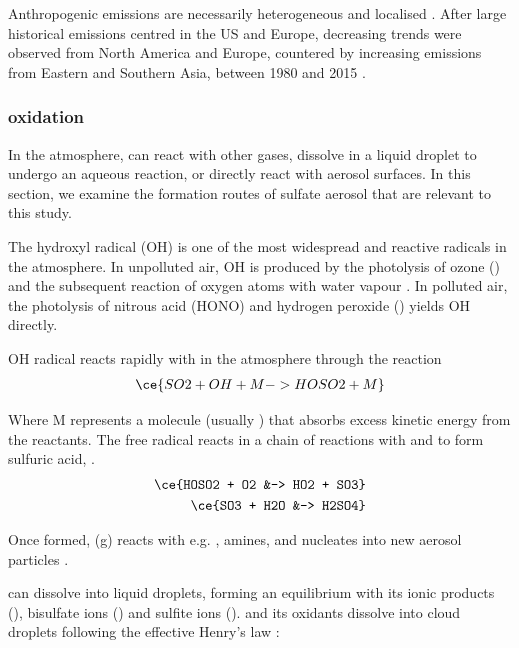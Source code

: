Anthropogenic  emissions are necessarily heterogeneous and localised \citep{manktelowRegionalGlobalTrends2007}. After large historical emissions centred in the US and Europe, decreasing trends were observed from North America and Europe, countered by increasing emissions from Eastern and Southern Asia, between 1980 and 2015 \citep{szopaShortlivedClimateForcers2021, aasGlobalRegionalTrends2019}. 




\subsubsection{ oxidation}
\label{ch1:so2-oxidation}

In the atmosphere,  can react with other gases, dissolve in a liquid droplet to undergo an aqueous reaction, or directly react with aerosol surfaces. In this section, we examine the formation routes of sulfate aerosol that are relevant to this study. 


The hydroxyl radical (OH) is one of the most widespread and reactive radicals in the atmosphere. In unpolluted air, OH is produced by the photolysis of ozone () and the subsequent reaction of oxygen atoms with water vapour \citep{wayneChemistryAtmospheresIntroduction2006}. In polluted air, the photolysis of nitrous acid (HONO) and hydrogen peroxide () yields OH directly. 

OH radical reacts rapidly with  in the atmosphere through the reaction
\begin{align}
\ce{SO2 + OH + M -> HOSO2 + M}    
\label{ch1:eq:so2-oh}
\end{align}

Where M represents a molecule (usually ) that absorbs excess kinetic energy from the reactants. The free radical  reacts in a chain of reactions with  and  to form sulfuric acid, .
\begin{align}
\ce{HOSO2 + O2 &-> HO2 + SO3}\\
\ce{SO3 + H2O &-> H2SO4}
\end{align}

Once formed,  (g) reacts with e.g. , amines,  and nucleates into new aerosol particles \citep{seinfeldAtmosphericChemistryPhysics2016}.


 can dissolve into liquid droplets, forming an equilibrium with its ionic products (), bisulfate ions () and sulfite ions ().  and its oxidants dissolve into cloud droplets following the effective Henry's law \citep{seinfeldAtmosphericChemistryPhysics2016}: 

